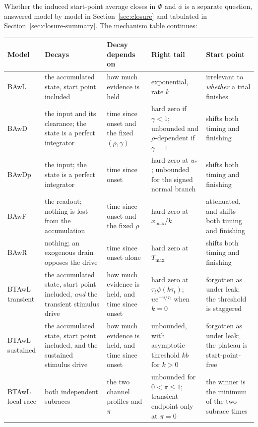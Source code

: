 \documentclass[12pt]{article}
\newcommand{\PhiN}{\Phi}
\newcommand{\phiN}{\phi}
\newcommand{\e}{\mathrm{e}}
\theoremstyle{remark}
\begin{document}
Whether the induced start-point average closes in $\PhiN$ and $\phiN$ is a separate question, answered model by model in Section~\ref{sec:closure} and tabulated in Section~\ref{sec:closure-summary}. The mechanism table continues:

\begin{center}
\small
\begin{tabular}{L{0.062\textwidth}L{0.20\textwidth}L{0.185\textwidth}L{0.185\textwidth}L{0.185\textwidth}}
\toprule
Model & Decays & Decay depends on & Right tail & Start point \\
\midrule
BAwL & the accumulated state, start point included &
how much evidence is held & exponential, rate $k$ &
irrelevant to \emph{whether} a trial finishes \\
\addlinespace
BAwD & the input and its clearance; the state is a perfect integrator &
time since onset and the fixed $(\rho,\gamma)$ &
hard zero if $\gamma<1$; unbounded and $\rho$-dependent if $\gamma=1$ &
shifts both timing and finishing \\
\addlinespace
BAwDp & the input; the state is a perfect integrator &
time since onset & hard zero at $u_{*}$; unbounded for the signed normal
branch & shifts both timing and finishing \\
\addlinespace
BAwF & the readout; nothing is lost from the accumulation &
time since onset and the fixed $\rho$ & hard zero at $x_{\max}/k$ &
attenuated, and shifts both timing and finishing \\
\addlinespace
BAwR & nothing; an exogenous drain opposes the drive &
time since onset alone & hard zero at $T_{\max}$ &
shifts both timing and finishing \\
\addlinespace
BTAwL transient & the accumulated state, start point included, \emph{and} the
transient stimulus drive &
how much evidence is held, and time since onset &
hard zero at $\tau_t\psi(k\tau_t)$; $u\e^{-u/\tau_t}$ when $k=0$ &
forgotten as under leak; the threshold is staggered \\
\addlinespace
BTAwL sustained & the accumulated state, start point included, and the
sustained stimulus drive &
how much evidence is held, and time since onset &
unbounded, with asymptotic threshold $kb$ for $k>0$ &
forgotten as under leak; the plateau is start-point-free \\
\addlinespace
BTAwL local race & both independent subraces &
the two channel profiles and $\pi$ &
unbounded for $0<\pi\le1$; transient endpoint only at $\pi=0$ &
the winner is the minimum of the two subrace times \\
\bottomrule
\end{tabular}
\end{center}
\end{document}
